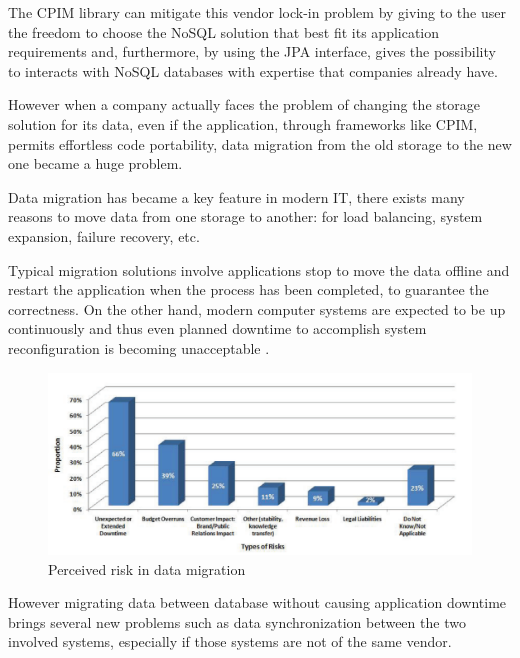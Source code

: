 \noindent The CPIM library can mitigate this vendor lock-in problem by giving to the user the freedom to choose the NoSQL solution that best fit its application requirements and, furthermore, by using the JPA interface, gives the possibility to interacts with NoSQL databases with expertise that companies already have.

\noindent However when a company actually faces the problem of changing the storage solution for its data, even if the application, through frameworks like CPIM, permits effortless code portability, data migration from the old storage to the new one became a huge problem. 

\newparagraph Data migration has became a key feature in modern IT, there exists many reasons to move data from one storage to another: for load balancing, system expansion, failure recovery, etc.

\noindent Typical migration solutions involve applications stop to move the data offline and restart the application when the process has been completed, to guarantee the correctness. On the other hand, modern computer systems are expected to be up continuously and thus even planned downtime to accomplish system reconfiguration is becoming unacceptable \cite{paper:hitachi}.

\begin{figure}[tbh]
  \centering
  \includegraphics[width=13cm]{images/hitachi_survey}
  \caption{Perceived risk in data migration \cite{paper:hitachi} }
  \label{fig:cpim-nosql}
\end{figure}

\noindent However migrating data between database without causing application downtime brings several new problems such as data synchronization between the two involved systems, especially if those systems are not of the same vendor.

